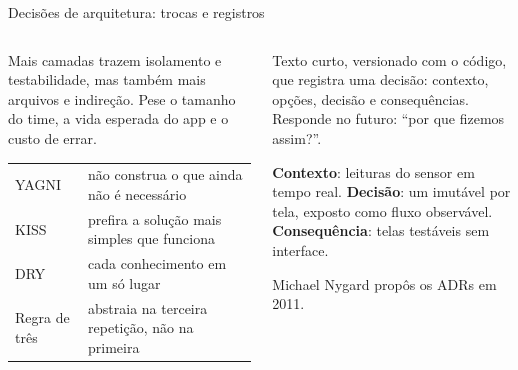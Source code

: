 \begin{frame}{Decisões de arquitetura: trocas e registros}
  \begin{columns}[T]
    \begin{column}{0.5\textwidth}
      \begin{conceito}
        Mais camadas trazem isolamento e testabilidade, mas também mais arquivos e indireção. Pese o tamanho do time, a vida esperada do app e o custo de errar.
      \end{conceito}
      \scriptsize
      \begin{tabularx}{\linewidth}{@{}l L@{}}
        \toprule
         &  \\
        \midrule
        YAGNI & não construa o que ainda não é necessário \\
        KISS & prefira a solução mais simples que funciona \\
        DRY & cada conhecimento em um só lugar \\
        Regra de três & abstraia na terceira repetição, não na primeira \\
        \bottomrule
      \end{tabularx}
    \end{column}
    \begin{column}{0.48\textwidth}
      \begin{definicao}
        Texto curto, versionado com o código, que registra uma decisão: contexto, opções, decisão e consequências. Responde no futuro: ``por que fizemos assim?''.
      \end{definicao}
      \begin{exemplo}
        \textbf{Contexto}: leituras do sensor em tempo real. \textbf{Decisão}: um  imutável por tela, exposto como fluxo observável. \textbf{Consequência}: telas testáveis sem interface.
      \end{exemplo}
      \begin{historia}
        Michael Nygard propôs os ADRs em 2011.
      \end{historia}
    \end{column}
  \end{columns}
\end{frame}
